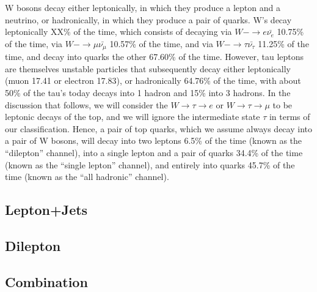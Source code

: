 W bosons decay either leptonically, in which they produce a lepton and a neutrino, or hadronically, in which they produce a pair of quarks.
W's decay leptonically XX\% of the time, which consists of decaying via $W- \rightarrow e \bar{\nu_{e}}$ 10.75\% of the time, via $W- \rightarrow \mu \bar{\nu_{\mu}}$ 10.57\% of the time, and via $W- \rightarrow \tau \bar{\nu_{\tau}}$ 11.25\% of the time, and decay into quarks the other 67.60\% of the time. %
However, tau leptons are themselves unstable particles that subsequently decay either leptonically (muon 17.41 or electron 17.83), or hadronically 64.76\% of the time, with about 50\% of the tau's today decays into 1 hadron and 15\% into 3 hadrons.
In the discussion that follows, we will consider the $W \rightarrow \tau  \rightarrow e$ or $W \rightarrow \tau  \rightarrow \mu$ to be leptonic decays of the top, and we will ignore the intermediate state $\tau$ in terms of our classification.
Hence, a pair of top quarks, which we assume always decay into a pair of W bosons, will decay into two leptons 6.5\% of the time (known as the ``dilepton'' channel), into a single lepton and a pair of quarks 34.4\% of the time (known as the ``single lepton'' channel), and entirely into quarks 45.7\% of the time (known as the ``all hadronic'' channel).








\subsection{Lepton+Jets}


\subsection{Dilepton}


\subsection{Combination}



